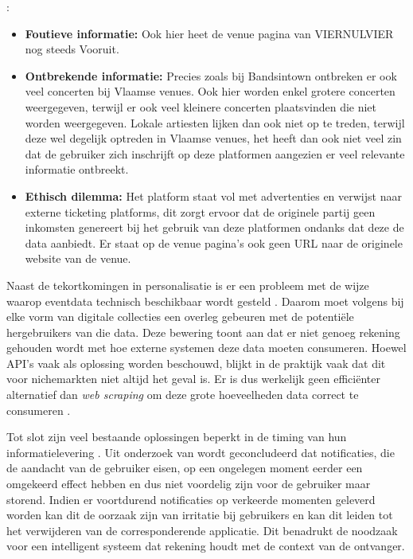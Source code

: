 \textcite{Songkick}:
\begin{itemize}
    \item \textbf{Foutieve informatie:} Ook hier heet de venue pagina van VIERNULVIER nog steeds Vooruit.
    \item \textbf{Ontbrekende informatie:} Precies zoals bij Bandsintown ontbreken er ook veel concerten bij Vlaamse venues. Ook hier worden enkel grotere concerten weergegeven, terwijl er ook veel kleinere concerten plaatsvinden die niet worden weergegeven. Lokale artiesten lijken dan ook niet op te treden, terwijl deze wel degelijk optreden in Vlaamse venues, het heeft dan ook niet veel zin dat de gebruiker zich inschrijft op deze platformen aangezien er veel relevante informatie ontbreekt.
    \item \textbf{Ethisch dilemma:} Het platform staat vol met advertenties en verwijst naar externe ticketing platforms, dit zorgt ervoor dat de originele partij geen inkomsten genereert bij het gebruik van deze platformen ondanks dat deze de data aanbiedt. Er staat op de venue pagina's ook geen \gls{URL} naar de originele website van de venue.
\end{itemize}

Naast de tekortkomingen in personalisatie is er een probleem met de wijze waarop eventdata technisch beschikbaar wordt gesteld \autocite{Rutten2018}. 
Daarom moet volgens \textcite{Rutten2018} bij elke vorm van digitale collecties een overleg gebeuren met de potentiële hergebruikers van die data. 
Deze bewering toont aan dat er niet genoeg rekening gehouden wordt met hoe externe systemen deze data moeten consumeren. 
Hoewel \gls{API}'s vaak als oplossing worden beschouwd, blijkt in de praktijk vaak dat dit voor nichemarkten niet altijd het geval is. 
Er is dus werkelijk geen efficiënter alternatief dan \textit{web scraping} om deze grote hoeveelheden data correct te consumeren \autocite{Vording2020}. 

Tot slot zijn veel bestaande oplossingen beperkt in de timing van hun informatielevering \autocite{NotificationSurvey2017}. 
Uit onderzoek van \textcite{NotificationSurvey2017} wordt geconcludeerd dat notificaties, 
die de aandacht van de gebruiker eisen, op een ongelegen moment eerder een omgekeerd effect hebben en dus niet voordelig zijn voor de gebruiker maar storend. 
Indien er voortdurend notificaties op verkeerde momenten geleverd worden kan dit de oorzaak zijn van irritatie bij gebruikers en kan dit leiden tot het verwijderen van de corresponderende applicatie. 
Dit benadrukt de noodzaak voor een intelligent systeem dat rekening houdt met de context van de ontvanger.


